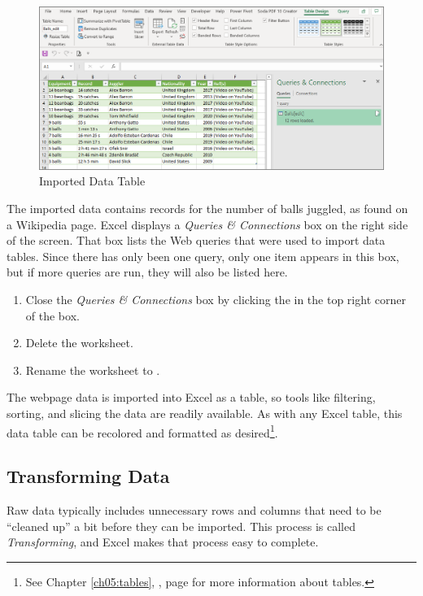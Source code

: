 \begin{figure}[H]
	\centering
	\includegraphics[width=\maxwidth{.95\linewidth}]{gfx/ch07_fig02c}
	\caption{Imported Data Table}
	\label{07:fig02c}
\end{figure}

The imported data contains records for the number of balls juggled, as found on a Wikipedia page. Excel displays a \textit{Queries \& Connections} box on the right side of the screen. That box lists the Web queries that were used to import data tables. Since there has only been one query, only one item appears in this box, but if more queries are run, they will also be listed here. 

\begin{enumbox}
	\begin{enumerate}
		\item Close the \textit{Queries \& Connections} box by clicking the  in the top right corner of the box.
		\item Delete the  worksheet.
		\item Rename the  worksheet to .
	\end{enumerate}
\end{enumbox}

The webpage data is imported into Excel as a table, so tools like filtering, sorting, and slicing the data are readily available. As with any Excel table, this data table can be recolored and formatted as desired\footnote{See Chapter \ref{ch05:tables}, , page \pageref{ch05:tables} for more information about tables.}.

\subsection{Transforming Data}

Raw data typically includes unnecessary rows and columns that need to be ``cleaned up'' a bit before they can be imported. This process is called \textit{Transforming}, and Excel makes that process easy to complete. 

